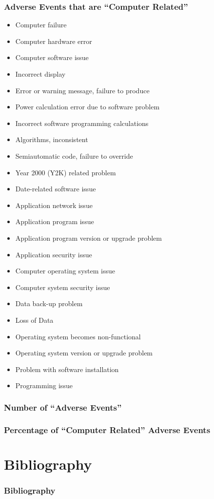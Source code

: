 \documentclass{beamer}
\begin{document}
  \begin{frame}
   \frametitle{Adverse Events that are ``Computer Related''}
   \smaller
   \begin{multicols}{2}
   \begin{itemize}
    \item Computer failure
    \item Computer hardware error
    \item Computer software issue
    \item Incorrect display
    \item Error or warning message, failure to produce
    \item Power calculation error due to software problem
    \item Incorrect software programming calculations
    \item Algorithms, inconsistent
    \item Semiautomatic code, failure to override
    \item Year 2000 (Y2K) related problem
    \item Date-related software issue
    \item Application network issue
    \item Application program issue
    \item Application program version or upgrade problem
    \item Application security issue
    \item Computer operating system issue
    \item Computer system security issue
    \item Data back-up problem
    \item Loss of Data
    \item Operating system becomes non-functional
    \item Operating system version or upgrade problem
    \item Problem with software installation
    \item Programming issue
   \end{itemize}
   \end{multicols}

  \end{frame}

  
  \begin{frame}
   \frametitle{Number of ``Adverse Events''}
   
  \end{frame}

  
  \begin{frame}
   \frametitle{Percentage of ``Computer Related'' Adverse Events}
   
  \end{frame}

  \section{Bibliography}

  \begin{frame}[allowframebreaks]
    \frametitle{Bibliography}
    \tiny
    \nocite{*}
    
  \end{frame}
\end{document}
